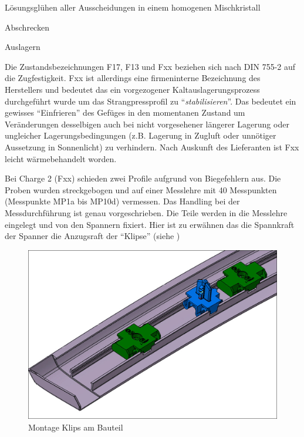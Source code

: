 \documentclass[12pt,a4paper,parskip]{scrartcl}
\begin{document}
\begin{enumerate*}
 \item Lösungsglühen aller Ausscheidungen in einem homogenen Mischkristall 
 \item Abschrecken
 \item Auslagern 
 \end{enumerate*}
 
   
 
 

Die Zustandsbezeichnungen F17, F13 und Fxx beziehen sich nach DIN 755-2 auf die Zugfestigkeit. Fxx ist allerdings eine firmeninterne Bezeichnung des Herstellers und bedeutet das ein  vorgezogener Kaltauslagerungsprozess durchgeführt wurde um das Strangpressprofil zu "`\emph{stabilisieren}"'. Das bedeutet ein gewisses "`Einfrieren"' des Gefüges in den momentanen Zustand um Veränderungen desselbigen auch bei nicht vorgesehener längerer Lagerung oder ungleicher Lagerungsbedingungen (z.B. Lagerung in Zugluft oder unnötiger Aussetzung in Sonnenlicht) zu verhindern. Nach Auskunft des Lieferanten ist Fxx leicht wärmebehandelt worden.


 Bei Charge 2 (Fxx) schieden zwei Profile aufgrund von Biegefehlern aus. Die Proben wurden streckgebogen und auf einer Messlehre  mit 40 Messpunkten (Messpunkte MP1a bis MP10d) vermessen. Das Handling bei der Messdurchführung ist genau vorgeschrieben. Die Teile werden in die Messlehre eingelegt und von den Spannern fixiert. Hier ist zu erwähnen das die Spannkraft der Spanner die Anzugsraft der "`Klipse"' (siehe )
 \begin{figure}[H]
 \centering
 \includegraphics[width=.8\textwidth]{klip}
 \caption{Montage Klips am Bauteil}
 \label{fig:klip}
 \end{figure}
 
\end{document}
